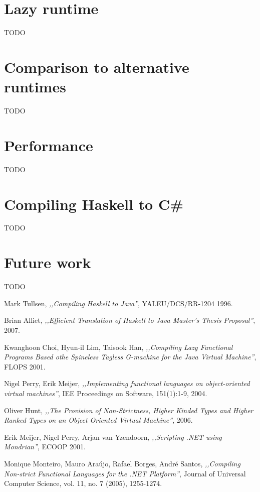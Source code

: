 \documentclass[en]{pracamgr}
\begin{document}
\chapter{Lazy runtime}\label{r:runtime}
TODO

\chapter{Comparison to alternative runtimes}\label{r:alternatives}
TODO

\chapter{Performance}\label{r:perf}
TODO

\chapter{Compiling Haskell to C\#}\label{r:compiler}
TODO

\chapter{Future work}\label{r:future}
TODO


\begin{thebibliography}{99}

 Mark Tullsen, \textit{,,Compiling Haskell to Java''}, YALEU/DCS/RR-1204
1996.

 Brian Alliet, \textit{,,Efficient Translation of Haskell to Java
Master’s Thesis Proposal''}, 2007.

 Kwanghoon Choi, Hyun-il Lim, Taisook Han, \textit{,,Compiling Lazy Functional Programs Based othe Spineless Tagless G-machine for the Java Virtual Machine''}, FLOPS 2001.

 Nigel Perry, Erik Meijer, \textit{,,Implementing functional languages on object-oriented virtual machines''}, IEE Proceedings on Software, 151(1):1-9, 2004.

 Oliver Hunt, \textit{,,The Provision of Non-Strictness, Higher Kinded Types
and Higher Ranked Types on an Object Oriented Virtual Machine''}, 2006.

 Erik Meijer, Nigel Perry, Arjan van Yzendoorn, \textit{,,Scripting .NET using Mondrian''}, ECOOP 2001.

 Monique Monteiro, Mauro Ara\'ujo, Rafael Borges, Andr\'e Santos,  \textit{,,Compiling Non-strict Functional Languages for the .NET Platform''}, Journal of Universal Computer Science, vol. 11, no. 7 (2005), 1255-1274.

\end{thebibliography}
\end{document}
